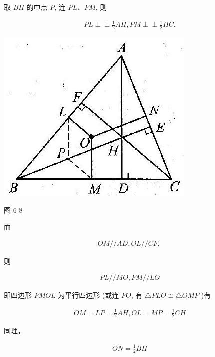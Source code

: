 \documentclass[10pt]{article}
\def\Perp{\perp\!\!\!\perp}
\begin{document}
取 $B H$ 的中点 $P$, 连 $P L 、 P M$, 则

\begin{align*}
P L \Perp \frac{1}{2} A H, P M \Perp \frac{1}{2} H C .
\end{align*}

\begin{center}
\includegraphics[max width=\textwidth]{2024_10_30_2c8f45efd4a519b08e1ag-064}
\end{center}

图 6-8

而

\begin{align*}
O M / / A D, O L / / C F \text {, }
\end{align*}

则

\begin{align*}
P L / / M O, P M / / L O
\end{align*}

即四边形 $P M O L$ 为平行四边形 (或连 $P O$, 有 $\triangle P L O \cong \triangle O M P$ )有

\begin{align*}
O M=L P=\frac{1}{2} A H, O L=M P=\frac{1}{2} C H
\end{align*}

同理，

\begin{align*}
O N=\frac{1}{2} B H
\end{align*}
\end{document}
